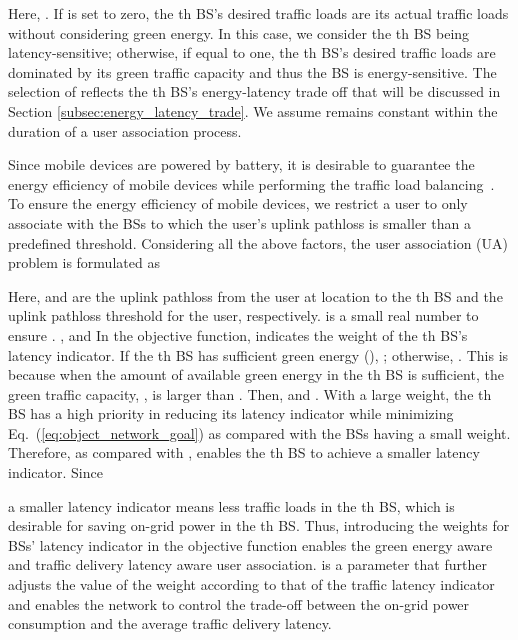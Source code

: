 \documentclass[journal]{IEEEtran}
\theoremstyle{definition}
\begin{document}
Here, .
If  is set to zero, the th BS's desired traffic loads are its actual traffic loads without considering green energy. In this case, we consider the th BS being latency-sensitive; otherwise, if  equal to one, the th BS's desired traffic loads are dominated by its green traffic capacity and thus the BS is energy-sensitive. The selection of  reflects the th BS's energy-latency trade off that will be discussed in Section \ref{subsec:energy_latency_trade}. We assume  remains constant within the duration of a user association process.


Since mobile devices are powered by battery, it is desirable to guarantee the energy efficiency of mobile devices while performing the traffic load balancing~\cite{Raj:2013:EAM}. To ensure the energy efficiency of mobile devices, we restrict a user to only associate with the BSs to which the user's uplink pathloss is smaller than a predefined threshold.
Considering all the above factors, the user association (UA) problem is formulated as

Here,  and  are the uplink pathloss from the user at location  to the th BS and the uplink pathloss threshold for the user, respectively.  is a small real number to ensure . , and 
In the objective function,  indicates the weight of the th BS's latency indicator. If the th BS has sufficient green energy (), ; otherwise, . This is because when the amount of available green energy in the th BS is sufficient, the green traffic capacity, , is larger than . Then,  and . With a large weight, the th BS has a high priority in reducing its latency indicator while minimizing Eq.~(\ref{eq:object_network_goal}) as compared with the BSs having a small weight. Therefore, as compared with ,  enables the th BS to achieve a smaller latency indicator.
Since

a smaller latency indicator means less traffic loads in the th BS, which is desirable for saving on-grid power in the th BS. Thus, introducing the weights for BSs' latency indicator in the objective function enables the green energy aware and traffic delivery latency aware user association.  is a parameter that further adjusts the value of the weight according to that of the traffic latency indicator and enables the network to control the trade-off between the on-grid power consumption and the average traffic delivery latency.
\end{document}
